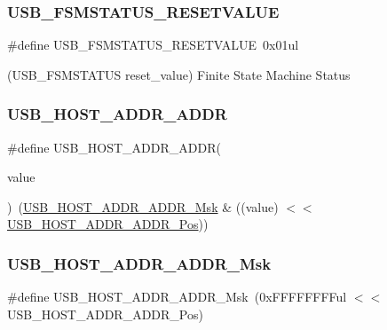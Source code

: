 \subsubsection{\texorpdfstring{USB\_FSMSTATUS\_RESETVALUE}{USB\_FSMSTATUS\_RESETVALUE}}
{\footnotesize\ttfamily \#define U\+S\+B\+\_\+\+F\+S\+M\+S\+T\+A\+T\+U\+S\+\_\+\+R\+E\+S\+E\+T\+V\+A\+L\+UE~0x01ul}



(U\+S\+B\+\_\+\+F\+S\+M\+S\+T\+A\+T\+US reset\+\_\+value) Finite State Machine Status 

\mbox{\label{group___s_a_m_d21___u_s_b_ga6ff1917bce6751f0bc55a5d990a5de02}} 
\subsubsection{\texorpdfstring{USB\_HOST\_ADDR\_ADDR}{USB\_HOST\_ADDR\_ADDR}}
{\footnotesize\ttfamily \#define U\+S\+B\+\_\+\+H\+O\+S\+T\+\_\+\+A\+D\+D\+R\+\_\+\+A\+D\+DR(\begin{DoxyParamCaption}\item[{}]{value }\end{DoxyParamCaption})~(\mbox{\hyperlink{group___s_a_m_d21___u_s_b_ga4e91d6769b2a2d693e253c9e17cef4be}{U\+S\+B\+\_\+\+H\+O\+S\+T\+\_\+\+A\+D\+D\+R\+\_\+\+A\+D\+D\+R\+\_\+\+Msk}} \& ((value) $<$$<$ \mbox{\hyperlink{group___s_a_m_d21___u_s_b_ga608a4201f066a3b5f143967efd6b13b6}{U\+S\+B\+\_\+\+H\+O\+S\+T\+\_\+\+A\+D\+D\+R\+\_\+\+A\+D\+D\+R\+\_\+\+Pos}}))}

\mbox{\label{group___s_a_m_d21___u_s_b_ga4e91d6769b2a2d693e253c9e17cef4be}} 
\subsubsection{\texorpdfstring{USB\_HOST\_ADDR\_ADDR\_Msk}{USB\_HOST\_ADDR\_ADDR\_Msk}}
{\footnotesize\ttfamily \#define U\+S\+B\+\_\+\+H\+O\+S\+T\+\_\+\+A\+D\+D\+R\+\_\+\+A\+D\+D\+R\+\_\+\+Msk~(0x\+F\+F\+F\+F\+F\+F\+F\+Ful $<$$<$ U\+S\+B\+\_\+\+H\+O\+S\+T\+\_\+\+A\+D\+D\+R\+\_\+\+A\+D\+D\+R\+\_\+\+Pos)}

